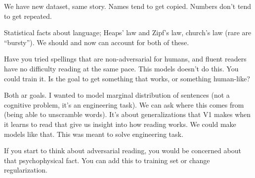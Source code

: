 We have new dataset, same story. Names tend to get copied. Numbers don't tend to get repeated. 


Statistical facts about language; Heaps' law and Zipf's law, church's law (rare are ``bursty''). We should and now can account for both of these.

Have you tried spellings that are non-adversarial for humans, and fluent readers have no difficulty reading at the same pace. This models doesn't do this. You could train it. Is the goal to get something that works, or something human-like? 

Both ar goals. I wanted to model marginal distribution of sentences (not a cognitive problem, it's an engineering task). We can ask where this comes from (being able to unscramble words). It's about generalizations that V1 makes when it learns to read that give us insight into how reading works. We could make models like that. This was meant to solve engineering task.

If you start to think about adversarial reading, you would be concerned about that psychophysical fact. You can add this to training set or change regularization.